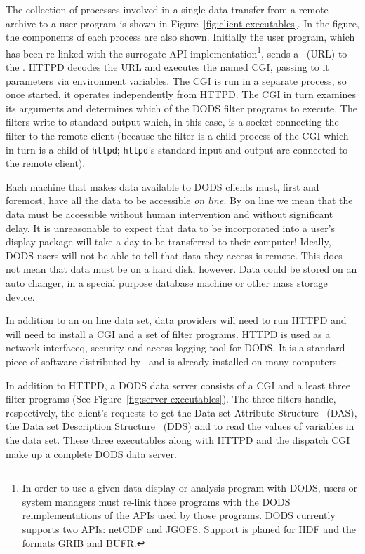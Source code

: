 The collection of processes involved in a single data transfer from a remote
archive to a user program is shown in Figure~\ref{fig:client-executables}.
In the figure, the components of each process are also shown. Initially the
user program, which has been re-linked with the surrogate API
implementation\footnote{In order to use a given data display or analysis
program with DODS, users or system managers must re-link those programs with
the DODS reimplementations of the APIs used by those programs. DODS currently
supports two APIs: netCDF and JGOFS\@. Support is planed for HDF and the
formats GRIB and BUFR\@.}, sends a \Url\ (URL) to the \HTTPD\@. HTTPD decodes the
URL and executes the named CGI, passing to it parameters via environment
variables. The CGI is run in a separate process, so once started, it
operates independently from HTTPD\@. The CGI in turn examines its arguments and
determines which of the DODS filter programs to execute. The filters
write to standard output which, in this case, is a  socket connecting the
filter to the remote client (because the filter is a child process of the CGI
which in turn is a child of {\tt httpd}; {\tt httpd}'s standard input and
output are connected to the remote client).

Each machine that makes data available to DODS clients must, first and
foremost, have all the data to be accessible {\em on line}. By on line we
mean that the data must be accessible without human intervention and without
significant delay. It is unreasonable to expect that data to be incorporated
into a user's display package will take a day to be transferred to their
computer! Ideally, DODS users will not be able to tell that data they access
is remote. This does not mean that data must be on a hard disk, however. Data
could be stored on an auto changer, in a special purpose database machine or
other mass storage device.

In addition to an on line data set, data providers will need to run HTTPD and
will need to install a CGI and a set of filter programs. HTTPD is used as a
network interfaceq, security and access logging tool for DODS\@. It is a
standard piece of software distributed by \NCSA\ and is already installed on
many computers.

In addition to HTTPD, a DODS data server consists of a CGI and a least three
filter programs (See Figure~\ref{fig:server-executables}). The three filters
handle, respectively, the client's requests to get the Data set Attribute
Structure~ (DAS), the Data set Description
Structure~ (DDS) and to read the values of variables in
the data set. These three executables along with HTTPD and the dispatch CGI
make up a complete DODS data server.

